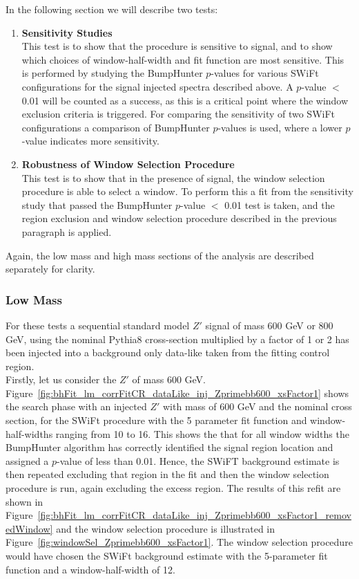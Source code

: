 \noindent
In the following section we will describe two tests:
\begin{enumerate}
  \item\textbf{Sensitivity Studies}\\
  This test is to show that the procedure is sensitive to signal,
  and to show which choices of window-half-width and fit function are most sensitive.
  This is performed by studying the {\sc BumpHunter} $p$-values for various SWiFt configurations for the signal injected spectra described above.
  A $p$-value $<$ 0.01 will be counted as a success, as this is a critical point  where the window exclusion criteria is triggered.
  For comparing the sensitivity of two SWiFt configurations a comparison of {\sc BumpHunter} $p$-values is used, where a lower $p$-value indicates more sensitivity.
  
  \item\textbf{Robustness of Window Selection Procedure}\\
  This test is to show that in the presence of signal, the window selection procedure is able to select a window.
  To perform this a fit from the sensitivity study that passed the {\sc BumpHunter} $p$-value $<$ 0.01 test is taken,
  and the region exclusion and  window selection procedure described in the previous paragraph is applied.
\end{enumerate}

\noindent
Again, the low mass and high mass sections of the analysis are described separately for clarity.

\subsubsection{Low Mass}
\label{sec:lowmass_signalInj}

For these tests a sequential standard model $Z'$ signal of mass 600 GeV or 800 GeV,
using the nominal Pythia8 cross-section multiplied by a factor of 1 or 2 has been injected into a background only data-like taken from the fitting control region. \\

Firstly, let us consider the $Z'$ of mass 600 GeV.
Figure~\ref{fig:bhFit_lm_corrFitCR_dataLike_inj_Zprimebb600_xsFactor1} shows the search phase with an injected $Z'$ with mass of 600 GeV and the nominal cross section,
for the SWiFt procedure with the 5 parameter fit function and window-half-widths ranging from 10 to 16.
This shows the that for all window widths the {\sc BumpHunter} algorithm has correctly identified the signal region location and assigned a $p$-value of less than 0.01.
Hence, the SWiFT background estimate is then repeated excluding that region in the fit and then the window selection procedure is run, again excluding the excess region.
The results of this refit are shown in Figure~\ref{fig:bhFit_lm_corrFitCR_dataLike_inj_Zprimebb600_xsFactor1_removedWindow}
and the window selection procedure is illustrated in Figure~\ref{fig:windowSel_Zprimebb600_xsFactor1}.
The window selection procedure would have chosen the SWiFt background estimate with the 5-parameter fit function and a window-half-width of 12.

